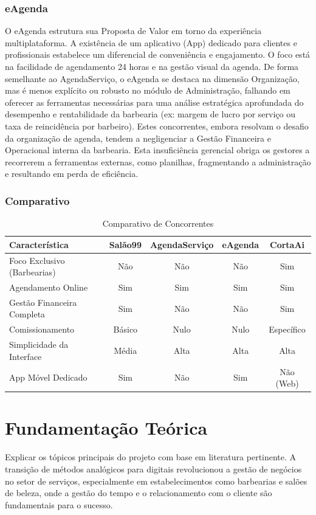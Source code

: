\documentclass[
    12pt, 
    a4paper, 
    oneside, 
    chapter=TITLE, 
    section=TITLE
]{abntex2}
\begin{document}
\subsection{eAgenda}
O eAgenda estrutura sua Proposta de Valor em torno da experiência multiplataforma. A existência de um aplicativo (App) dedicado para clientes e profissionais estabelece um diferencial de conveniência e engajamento. O foco está na facilidade de agendamento 24 horas e na gestão visual da agenda. De forma semelhante ao AgendaServiço, o eAgenda se destaca na dimensão Organização, mas é menos explícito ou robusto no módulo de Administração, falhando em oferecer as ferramentas necessárias para uma análise estratégica aprofundada do desempenho e rentabilidade da barbearia (ex: margem de lucro por serviço ou taxa de reincidência por barbeiro). Estes concorrentes, embora resolvam o desafio da organização de agenda, tendem a negligenciar a Gestão Financeira e Operacional interna da barbearia. Esta insuficiência gerencial obriga os gestores a recorrerem a ferramentas externas, como planilhas, fragmentando a administração e resultando em perda de eficiência.

\subsection{Comparativo}
\begin{table}[htb]
    \centering
    \caption{Comparativo de Concorrentes}
    \label{tab:concorrentes}
    \begin{tabular}{lcccc}
        \toprule
        \textbf{Característica} & \textbf{Salão99} & \textbf{AgendaServiço} & \textbf{eAgenda} & \textbf{CortaAi} \\
        \midrule
        Foco Exclusivo (Barbearias) & Não & Não & Não & Sim \\
        Agendamento Online & Sim & Sim & Sim & Sim \\
        Gestão Financeira Completa & Sim & Não & Não & Sim \\
        Comissionamento & Básico & Nulo & Nulo & Específico \\
        Simplicidade da Interface & Média & Alta & Alta & Alta \\
        App Móvel Dedicado & Sim & Não & Sim & Não (Web) \\
        \bottomrule
    \end{tabular}
\end{table}

\chapter{Fundamentação Teórica}
Explicar os tópicos principais do projeto com base em literatura pertinente.
A transição de métodos analógicos para digitais revolucionou a gestão de negócios no setor de serviços, especialmente em estabelecimentos como barbearias e salões de beleza, onde a gestão do tempo e o relacionamento com o cliente são fundamentais para o sucesso.
\end{document}
